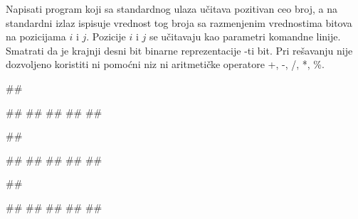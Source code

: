 \begin{Exercise}[label=209]%
Napisati program koji sa standardnog ulaza učitava pozitivan ceo broj, a na standardni izlaz ispisuje vrednost tog broja sa razmenjenim vrednostima bitova na pozicijama $i$ i $j$. Pozicije $i$ i $j$ se učitavaju kao parametri
  komandne linije. Smatrati da je krajnji desni bit binarne
  reprezentacije -ti bit. Pri rešavanju nije dozvoljeno koristiti
  ni pomoćni niz ni aritmetičke operatore +, -, /, *, \%.

\begin{minitest}
\begin{upotreba}{1}
##

#\naslovInt#
#\naslovUlaz#
##
#\naslovIzlaz#
##
\end{upotreba}
\end{minitest}
\begin{minitest}
\begin{upotreba}{2}
##

#\naslovInt#
#\naslovUlaz#
##
#\naslovIzlaz#
##
\end{upotreba}
\end{minitest}
\begin{minitest}
\begin{upotreba}{2}
##

#\naslovInt#
#\naslovUlaz#
##
#\naslovIzlaz#
##
\end{upotreba}
\end{minitest}

\end{Exercise}


